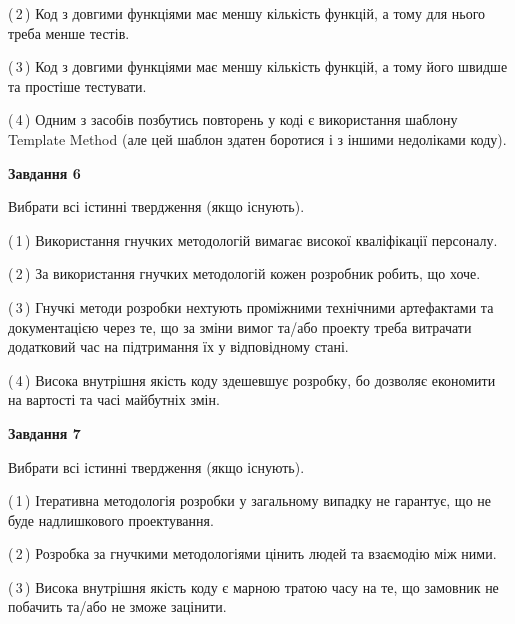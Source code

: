 \documentclass[10pt, ukrainian]{article}
\begin{document}
{\begin {large}
(\,2\,) Код з довгими функціями має меншу кількість функцій, а тому для нього треба менше тестів. %



(\,3\,) Код з довгими функціями має меншу кількість функцій, а тому його швидше та простіше тестувати. %



(\,4\,) Одним з засобів позбутись повторень у коді є використання шаблону Template Method (але цей шаблон здатен боротися і з іншими недоліками коду). %

\newpage

{\begin {center}\textbf{Завдання 6}\end {center}}\par
Вибрати всі істинні твердження (якщо існують).\par
\vspace{2mm}



(\,1\,) Використання гнучких методологій вимагає високої кваліфікації персоналу. %



(\,2\,) За використання гнучких методологій кожен розробник робить, що хоче. %



(\,3\,) Гнучкі методи розробки нехтують проміжними технічними артефактами та документацією через те, що за зміни вимог та/або проекту треба витрачати додатковий час на підтримання їх у відповідному стані. %



(\,4\,) Висока внутрішня якість коду здешевшує розробку, бо дозволяє економити на вартості та часі майбутніх змін. %


{\begin {center}\textbf{Завдання 7}\end {center}}\par
Вибрати всі істинні твердження (якщо існують).\par
\vspace{2mm}



(\,1\,) Ітеративна методологія розробки у загальному випадку не гарантує, що не буде надлишкового проектування. %



(\,2\,) Розробка за гнучкими методологіями цінить людей та взаємодію між ними. %



(\,3\,) Висока внутрішня якість коду є марною тратою часу на те, що замовник не побачить та/або не зможе зацінити. %




\end{large}}
\end{document}

